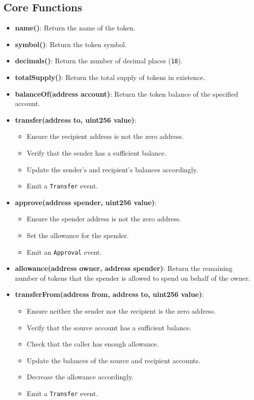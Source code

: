 \documentclass[12pt]{article}
\begin{document}
\subsection*{Core Functions}
\begin{itemize}
  \item \textbf{name()}: Return the name of the token.
  \item \textbf{symbol()}: Return the token symbol.
  \item \textbf{decimals()}: Return the number of decimal places (\texttt{18}).
  \item \textbf{totalSupply()}: Return the total supply of tokens in existence.
  \item \textbf{balanceOf(address account)}: Return the token balance of the specified account.
  \item \textbf{transfer(address to, uint256 value)}:
  \begin{itemize}
      \item Ensure the recipient address is not the zero address.
      \item Verify that the sender has a sufficient balance.
      \item Update the sender's and recipient's balances accordingly.
      \item Emit a \texttt{Transfer} event.
  \end{itemize}
  \item \textbf{approve(address spender, uint256 value)}:
  \begin{itemize}
      \item Ensure the spender address is not the zero address.
      \item Set the allowance for the spender.
      \item Emit an \texttt{Approval} event.
  \end{itemize}
  \item \textbf{allowance(address owner, address spender)}: Return the remaining number of tokens that the spender is allowed to spend on behalf of the owner.
  \item \textbf{transferFrom(address from, address to, uint256 value)}:
  \begin{itemize}
      \item Ensure neither the sender nor the recipient is the zero address.
      \item Verify that the source account has a sufficient balance.
      \item Check that the caller has enough allowance.
      \item Update the balances of the source and recipient accounts.
      \item Decrease the allowance accordingly.
      \item Emit a \texttt{Transfer} event.
  \end{itemize}
\end{itemize}
\end{document}
